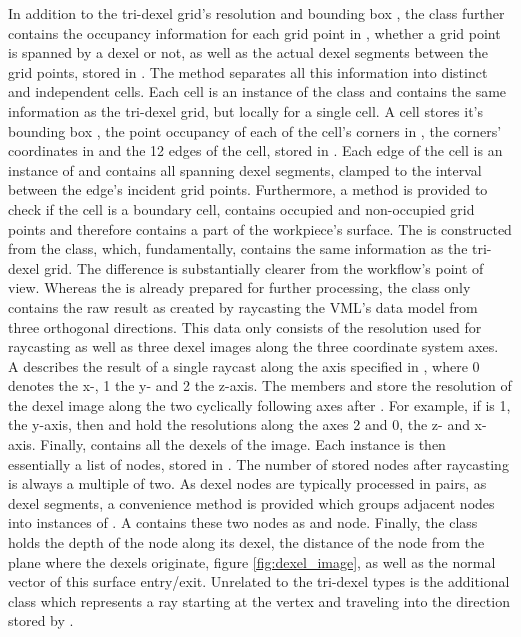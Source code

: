 In addition to the tri-dexel grid's resolution  and bounding box , the  class further contains the occupancy information for each grid point in , \ie whether a grid point is spanned by a dexel or not, as well as the actual dexel segments between the grid points, stored in .
The  method separates all this information into distinct and independent cells.
Each cell is an instance of the  class and contains the same information as the tri-dexel grid, but locally for a single cell.
A cell stores it's bounding box , the point occupancy of each of the cell's corners in , the corners' coordinates in  and the 12 edges of the cell, stored in .
Each edge of the cell is an instance of  and contains all spanning dexel segments, clamped to the interval between the edge's incident grid points.
Furthermore, a method  is provided to check if the cell is a boundary cell, \ie contains occupied and non-occupied grid points and therefore contains a part of the workpiece's surface.
The  is constructed from the  class, which, fundamentally, contains the same information as the tri-dexel grid.
The difference is substantially clearer from the workflow's point of view.
Whereas the  is already prepared for further processing, the  class only contains the raw result as created by raycasting the VML's data model from three orthogonal directions.
This data only consists of the resolution  used for raycasting as well as three dexel images  along the three coordinate system axes.
A  describes the result of a single raycast along the axis specified in , where 0 denotes the x-, 1 the y- and 2 the z-axis.
The members  and  store the resolution of the dexel image along the two cyclically following axes after .
For example, if  is 1, the y-axis, then  and  hold the resolutions along the axes 2 and 0, the z- and x-axis.
Finally,  contains all the dexels of the image.
Each  instance is then essentially a list of nodes, stored in .
The number of stored nodes after raycasting is always a multiple of two.
As dexel nodes are typically processed in pairs, as dexel segments, a convenience method  is provided which groups adjacent nodes into instances of .
A  contains these two nodes as  and  node.
Finally, the  class holds the depth of the node along its dexel, \ie the distance of the node from the plane where the dexels originate, \cf figure \ref{fig:dexel_image}, as well as the normal vector of this surface entry/exit.
Unrelated to the tri-dexel types is the additional class  which represents a ray starting at the vertex  and traveling into the direction stored by .

